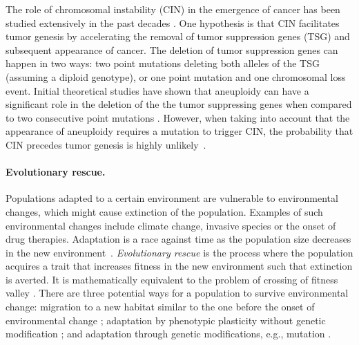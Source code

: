 \documentclass[12pt]{extarticle}
\begin{document}
The role of chromosomal instability (CIN) in the emergence of cancer has been studied extensively in the past decades \citep{michor2005can,christine2018understanding,nowak2002role,pavelka2010dr,komarova2003mutation,zhu2018cellular}.
One hypothesis is that CIN facilitates tumor genesis by accelerating the removal of tumor suppression genes (TSG) and subsequent appearance of cancer. The deletion of tumor suppression genes can happen in two ways: two point mutations deleting both alleles of the TSG (assuming a diploid genotype), or one point mutation and one chromosomal loss event.
Initial theoretical studies have shown that aneuploidy can have a significant role in the deletion of the the tumor suppressing genes when compared to two consecutive point mutations \citep{nowak2002role,komarova2003mutation,michor2005can,komarova2008selective}.
However, when taking into account that the appearance of aneuploidy requires a mutation to trigger CIN, the probability that CIN precedes tumor genesis is highly unlikely~\citep{komarova2004optimal}.

\paragraph{Evolutionary rescue.} Populations adapted to a certain environment are vulnerable to environmental changes, which might cause extinction of the population. Examples of such environmental changes include climate change, invasive species or the onset of drug therapies. Adaptation is a race against time as the population size decreases in the new environment~\citep{tanaka2022surviving}. 
\emph{Evolutionary rescue} is the process where the population acquires a trait that increases fitness in the new environment such that extinction is averted. It is mathematically equivalent to the problem of crossing of fitness valley \citep{weissman2009rate,weissman2010rate}.
There are three potential ways for a population to survive environmental change: migration to a new habitat similar to the one before the onset of environmental change \citep{harsch2014keeping,cobbold2020should,zhou2022range}; adaptation by phenotypic plasticity without genetic modification \citep{carja2019evolutionary,carja2017evolutionary,levien2021non}; and adaptation through genetic modifications, e.g., mutation \citep{uecker2014evolutionary,uecker2016role,uecker2011fixation,orr2014population}.
\end{document}
